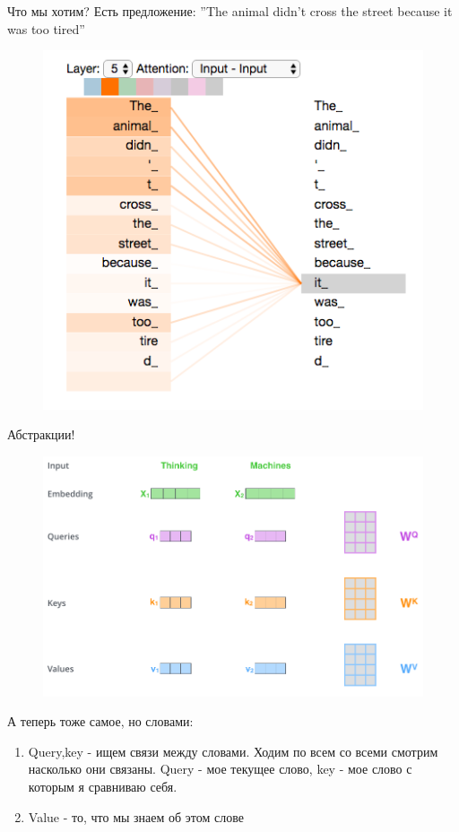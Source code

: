 \documentclass[notes,12pt, aspectratio=169]{beamer}
\begin{document}
\begin{frame}{Что мы хотим?}
Есть предложение:
”The animal didn't cross the street because it was too tired”
\begin{figure}
	\centering
	\includegraphics[width=0.37\linewidth]{images/transformer_self-attention_visualization}
	\label{fig:seq2seq}
\end{figure}
\end{frame}

\begin{frame}{Абстракции!}
\begin{figure}
	\centering
	\includegraphics[width=0.8\linewidth]{images/transformer_self_attention_vectors}
	\label{fig:seq2seq}
\end{figure}
\end{frame}


\begin{frame}
А теперь тоже самое, но словами:
\begin{enumerate}
	\item Query,key - ищем связи между словами. Ходим по всем со всеми смотрим насколько они связаны. Query - мое текущее слово, key - мое слово с которым я сравниваю себя.
	\item Value - то, что мы знаем об этом слове
\end{enumerate}
\end{frame}
\end{document}
